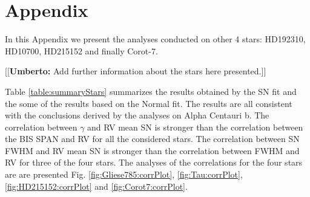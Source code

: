 \documentclass[11pt, oneside]{article}
\newcommand{\umberto}[1]{{\color{green}[[\textbf{Umberto: }#1]]}}
\begin{document}
\appendix
\section{Appendix} \label{appendix}

In this Appendix we present the analyses conducted on other 4 stars: HD192310, HD10700, HD215152 and finally Corot-7. 

\umberto{Add further information about the stars here presented.}

Table \ref{table:summaryStars} summarizes the results obtained by the SN fit and the some of the results based on the Normal fit. The results are all consistent with the conclusions derived by the analyses on Alpha Centauri b. The correlation between $\gamma$ and RV mean SN is stronger than the correlation between the BIS SPAN and RV for all the considered stars. The correlation between SN FWHM and RV mean SN is stronger than the correlation between FWHM and RV for three of the four stars. The analyses of the correlations for the four stars are are presented Fig. \ref{fig:Gliese785:corrPlot}, \ref{fig:Tau:corrPlot}, \ref{fig:HD215152:corrPlot} and \ref{fig:Corot7:corrPlot}.
\end{document}

